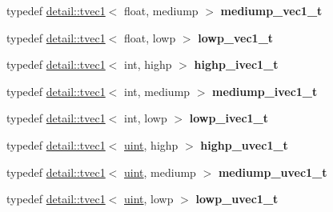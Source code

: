 \begin{DoxyCompactItemize}
\item 
typedef \hyperlink{structglm_1_1detail_1_1tvec1}{detail\+::tvec1}$<$ float, mediump $>$ {\bfseries mediump\+\_\+vec1\+\_\+t}\hypertarget{namespaceglm_a34591cc7729d24d31e7c1af9ab86d8be}{}\label{namespaceglm_a34591cc7729d24d31e7c1af9ab86d8be}

\item 
typedef \hyperlink{structglm_1_1detail_1_1tvec1}{detail\+::tvec1}$<$ float, lowp $>$ {\bfseries lowp\+\_\+vec1\+\_\+t}\hypertarget{namespaceglm_a6f4858c888bac87e7fbae4addee5719b}{}\label{namespaceglm_a6f4858c888bac87e7fbae4addee5719b}

\item 
typedef \hyperlink{structglm_1_1detail_1_1tvec1}{detail\+::tvec1}$<$ int, highp $>$ {\bfseries highp\+\_\+ivec1\+\_\+t}\hypertarget{namespaceglm_a3927b4c7e92eb102463facebfe2c0e0d}{}\label{namespaceglm_a3927b4c7e92eb102463facebfe2c0e0d}

\item 
typedef \hyperlink{structglm_1_1detail_1_1tvec1}{detail\+::tvec1}$<$ int, mediump $>$ {\bfseries mediump\+\_\+ivec1\+\_\+t}\hypertarget{namespaceglm_a4e6e24e94c7570374fccd106c91e8bb8}{}\label{namespaceglm_a4e6e24e94c7570374fccd106c91e8bb8}

\item 
typedef \hyperlink{structglm_1_1detail_1_1tvec1}{detail\+::tvec1}$<$ int, lowp $>$ {\bfseries lowp\+\_\+ivec1\+\_\+t}\hypertarget{namespaceglm_a922780199c60272ceb0a56cad13a6c31}{}\label{namespaceglm_a922780199c60272ceb0a56cad13a6c31}

\item 
typedef \hyperlink{structglm_1_1detail_1_1tvec1}{detail\+::tvec1}$<$ \hyperlink{group__core__precision_ga4fd29415871152bfb5abd588334147c8}{uint}, highp $>$ {\bfseries highp\+\_\+uvec1\+\_\+t}\hypertarget{namespaceglm_ab849167b499d58c4ec64b435d9696115}{}\label{namespaceglm_ab849167b499d58c4ec64b435d9696115}

\item 
typedef \hyperlink{structglm_1_1detail_1_1tvec1}{detail\+::tvec1}$<$ \hyperlink{group__core__precision_ga4fd29415871152bfb5abd588334147c8}{uint}, mediump $>$ {\bfseries mediump\+\_\+uvec1\+\_\+t}\hypertarget{namespaceglm_a7df2834f455bdd3c3b82ff7cb60f272a}{}\label{namespaceglm_a7df2834f455bdd3c3b82ff7cb60f272a}

\item 
typedef \hyperlink{structglm_1_1detail_1_1tvec1}{detail\+::tvec1}$<$ \hyperlink{group__core__precision_ga4fd29415871152bfb5abd588334147c8}{uint}, lowp $>$ {\bfseries lowp\+\_\+uvec1\+\_\+t}\hypertarget{namespaceglm_a5b77766992759c6490e538bbf7e7cd79}{}\label{namespaceglm_a5b77766992759c6490e538bbf7e7cd79}


\end{DoxyCompactItemize}
